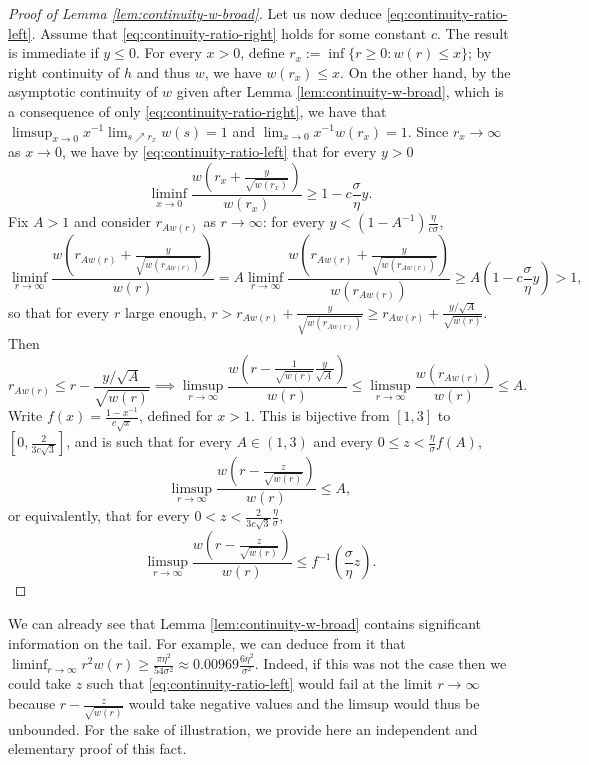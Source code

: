 \documentclass[10pt,a4paper]{article}
\begin{document}
\begin{proof}[Proof of Lemma \ref{lem:continuity-w-broad}]
Let us now deduce \eqref{eq:continuity-ratio-left}. Assume that \eqref{eq:continuity-ratio-right} holds for some constant $c$. The result is immediate if $y\leq 0$. For every $x>0$, define $r_x := \inf\{r\geq 0 : w(r) \leq x \}$; by right continuity of $h$ and thus $w$, we have $w(r_x) \leq x$. On the other hand, by the asymptotic continuity of $w$ given after Lemma \ref{lem:continuity-w-broad}, which is a consequence of only \eqref{eq:continuity-ratio-right}, we have that $\limsup_{x\to 0} x^{-1} \lim_{s\nearrow r_x} w(s) = 1$ and $\lim_{x\to 0} x^{-1} w(r_x) = 1$. 
Since $r_x \to \infty$ as $x\to 0$, we have by \eqref{eq:continuity-ratio-left} that for every $y>0$ 
\[ \liminf_{x\to 0} \frac{w\left(r_x + \frac{y}{\sqrt{w(r_x)}}\right)}{w(r_x)} \geq 1 - c\frac{\sigma}{\eta} y . \]
Fix $A > 1$ and consider $r_{Aw(r)}$ as $r\to\infty$: for every $y < (1-A^{-1})\frac{\eta}{c\sigma}$, 
\begin{equation*}
\liminf_{r\to \infty} \frac{w\left(r_{Aw(r)} + \frac{y}{\sqrt{w(r_{Aw(r)})}}\right)}{w(r)} = A \liminf_{r\to \infty} \frac{w\left(r_{Aw(r)} + \frac{y}{\sqrt{w(r_{Aw(r)})}}\right)}{w(r_{Aw(r)})} \geq A \left(1 - c\frac{\sigma}{\eta} y\right) > 1 , 
\end{equation*}
so that for every $r$ large enough, $r > r_{Aw(r)} + \frac{y}{\sqrt{w(r_{Aw(r)})}} \geq r_{Aw(r)} + \frac{y/\sqrt{A}}{\sqrt{w(r)}}$. Then 
\[ r_{Aw(r)} \leq r - \frac{y/\sqrt{A}}{\sqrt{w(r)}} \implies \limsup_{r\to\infty} \frac{ w\left( r - \frac{1}{\sqrt{w(r)}} \frac{y}{\sqrt{A}} \right)}{w(r)} \leq \limsup_{r\to\infty} \frac{ w\left( r_{Aw(r)} \right)}{w(r)} \leq A . \]
Write $f(x) = \frac{1-x^{-1}}{c\sqrt{x}}$, defined for $x>1$. This is bijective from $[1, 3]$ to $[0, \frac{2}{3c\sqrt{3}}]$, and is such that for every $A\in(1,3)$ and every $0\leq z < \frac{\eta}{\sigma} f(A)$, 
\[ \limsup_{r\to\infty} \frac{ w\left( r - \frac{z}{\sqrt{w(r)}} \right)}{w(r)} \leq A , \]
or equivalently, that for every $0<z<\frac{2}{3c\sqrt{3}} \frac{\eta}{\sigma}$, 
\[ \limsup_{r\to\infty} \frac{ w\left( r - \frac{z}{\sqrt{w(r)}} \right)}{w(r)} \leq f^{-1}\left(\frac{\sigma}{\eta} z\right) . \]
\end{proof}




We can already see that Lemma \ref{lem:continuity-w-broad} contains significant information on the tail. For example, we can deduce from it that $\liminf_{r\to\infty} r^2 w(r) \geq \frac{\pi \eta^2}{54 \sigma^2} \approx 0.00969 \frac{6 \eta^2}{\sigma^2}$. Indeed, if this was not the case then we could take $z$ such that \eqref{eq:continuity-ratio-left} would fail at the limit $r\to\infty$ because $r-\frac{z}{\sqrt{w(r)}}$ would take negative values and the limsup would thus be unbounded. For the sake of illustration, we provide here an independent and elementary proof of this fact. %
\end{document}
